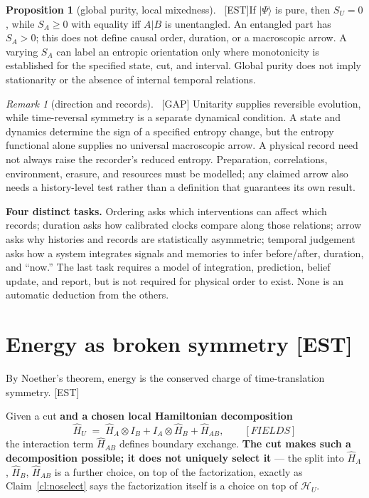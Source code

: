 \documentclass[11pt]{article}
\newcommand{\est}{\textcolor{teal!70!black}{\textsf{\small[EST]}}}
\newcommand{\fields}{\textcolor{violet}{\textsf{\small[FIELDS]}}}
\newcommand{\asm}{\textcolor{blue!70!black}{\textsf{\small[ASM]}}}
\newcommand{\gap}{\textcolor{red!75!black}{\textsf{\small[GAP]}}}
\def\est{[EST]}\def\fields{[FIELDS]}\def\asm{[ASM]}%
\def\quad{ }\def\normalsize{}%
\theoremstyle{definition}
\newtheorem{proposition}{Proposition}[section]
\theoremstyle{remark}
\newtheorem*{remark}{Remark}
\begin{document}
\begin{proposition}[global purity, local mixedness]{\normalfont\ \est}\label{prop:purity}
If $\lvert\Psi\rangle$ is pure, then $S_U=0$, while $S_A\ge0$ with equality iff $A\vert B$ is unentangled. An entangled part has $S_A>0$; this does not define causal order, duration, or a macroscopic arrow. A varying $S_A$ can label an entropic orientation only where monotonicity is established for the specified state, cut, and interval. Global purity does not imply stationarity or the absence of internal temporal relations.
\end{proposition}

\begin{remark}[direction and records]{\normalfont\ \gap}
Unitarity supplies reversible evolution, while time-reversal symmetry is a separate dynamical condition. A state and dynamics determine the sign of a specified entropy change, but the entropy functional alone supplies no universal macroscopic arrow. A physical record need not always raise the recorder's reduced entropy. Preparation, correlations, environment, erasure, and resources must be modelled; any claimed arrow also needs a history-level test rather than a definition that guarantees its own result.
\end{remark}

\noindent\textbf{Four distinct tasks.} Ordering asks which interventions can affect which records; duration asks how calibrated clocks compare along those relations; arrow asks why histories and records are statistically asymmetric; temporal judgement asks how a system integrates signals and memories to infer before/after, duration, and ``now.'' The last task requires a model of integration, prediction, belief update, and report, but is not required for physical order to exist. None is an automatic deduction from the others.

\section{Energy as broken symmetry \quad{\normalsize\est}\label{sec:energy}}

By Noether's theorem, energy is the conserved charge of time-translation symmetry. \est{}

Given a cut \textbf{and a chosen local Hamiltonian decomposition}
\[
  \hat{H}_U \;=\; \hat{H}_A\otimes I_B + I_A\otimes\hat{H}_B + \hat{H}_{AB}, \qquad \fields
\]
the interaction term $\hat{H}_{AB}$ defines boundary exchange. \textbf{The cut makes such a decomposition possible; it does not uniquely select it} --- the split into $\hat{H}_A$, $\hat{H}_B$, $\hat{H}_{AB}$ is a further choice, on top of the factorization, exactly as Claim~\ref{cl:noselect} says the factorization itself is a choice on top of $\mathcal{H}_U$.
\end{document}
